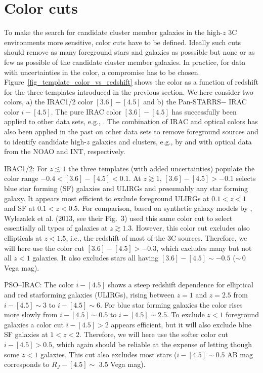 \documentclass[mathleft,fleqn,%
]{an}
\begin{document}
\section{Color cuts} \label{sec:color_cuts}

To make the search for candidate cluster member galaxies in the high-$z$ 
3C environments more sensitive, color cuts have to be
defined. 
Ideally such cuts should remove as many foreground stars and galaxies as
posssible but none or as few as possible of the candidate cluster
member galaxies.  
In practice, for data with uncertainties in the color, a compromise has
to be chosen. 
Figure~\ref{fig_template_color_vs_redshift} shows the color 
as a function of redshift for the three templates introduced in the
previous section. 
We here consider two colors, a) the IRAC1/2 color  $[3.6] - [4.5]$
and b) the  Pan-STARRS$-$ IRAC color $i - [4.5]$. 
The pure IRAC color  $[3.6] - [4.5]$ has successfully been applied to
other data sets, e.g., \citet{Wylezalek13}. 
The combination of IRAC and optical colors has also been applied in
the past on other data sets to remove foreground sources and to
identify candidate high-$z$ 
galaxies and clusters, e.g., by \citet{Eisenhardt04, Eisenhardt08} and
\citet{Falder11} with optical data from 
the NOAO and INT, respectively.


IRAC1/2:
  For $z \lesssim 1$ the three templates (with added uncertainties)
  populate the color range $-0.4 < [3.6] - [4.5] < 0.1$.
  At  $z \gtrsim 1$, 
  $[3.6] - [4.5] > -0.1$
  selects blue star
  forming (SF) galaxies and ULIRGs and presumably any star
  forming galaxy.
  It appears most efficient to exclude foreground ULIRGs at $0.1 < z <
  1$ and SF at $0.1 < z < 0.5$.
  For comparison, 
  based on synthetic galaxy models by \citet{Bruzual03},
  Wylezalek et al. (2013, see their Fig.~3) 
  used this same color cut to select
  essentially all types of galaxies at  $z \gtrsim 1.3$.
  However, this color cut excludes also 
  ellipticals at $z < 1.5$, i.e., the redshift of most of the 3C sources.
  Therefore, we will here use the color cut 
  $[3.6] - [4.5] > -0.3$, which excludes many but not all $z<1$
  galaxies. It also excludes stars all having $[3.6] - [4.5] \sim
  -0.5$ ($\sim$\,0 Vega mag).
  
PSO--IRAC:
  The color $i - [4.5]$ shows a steep redshift dependence for elliptical
  and red starforming galaxies (ULIRGs), rising between $z=1$ and
  $z=2.5$ from $i - [4.5] \sim  3$  to  $i - [4.5] \sim 6$.
  For blue star forming galaxies the color rises more slowly from 
  $i - [4.5] \sim  0.5$  to  $i - [4.5] \sim 2.5$. 
  To exclude $z<1$ foreground galaxies a color cut $i - [4.5] >2$
  appears efficient, but it will also exclude blue SF galaxies at $1<z<2$.
  Therefore, we will here use the softer color cut 
  $i - [4.5] > 0.5$, which again should be reliable at the expense of
  letting though some $z<1$ galaxies. 
  This cut also excludes most stars
  ($i - [4.5] \sim  0.5$ AB mag corresponds to $R_{J} - [4.5] \sim$ 3.5 Vega mag).
\end{document}
